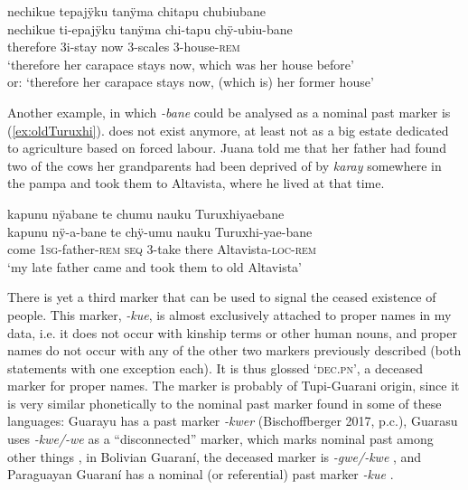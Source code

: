 \ea\label{ex:former-house}
\begingl 
\glpreamble nechikue tepajÿku tanÿma chitapu chubiubane\\
\gla nechikue ti-epajÿku tanÿma chi-tapu chÿ-ubiu-bane\\ 
\glb therefore 3i-stay now 3-scales 3-house-\textsc{rem}\\ 
\glft ‘therefore her carapace stays now, which was her house before’\\or: ‘therefore her carapace stays now, (which is) her former house’
\trailingcitation{[rxx-n121128s.24]}
\xe

Another example, in which \textit{-bane} could be analysed as a nominal past marker is (\ref{ex:oldTuruxhi}).  does not exist anymore, at least not as a big estate dedicated to agriculture based on forced labour. Juana told me that her father had found two of the cows her grandparents had been deprived of by \textit{karay} somewhere in the pampa and took them to Altavista, where he lived at that time.

\ea\label{ex:oldTuruxhi}
\begingl
\glpreamble kapunu nÿabane te chumu nauku Turuxhiyaebane\\
\gla kapunu nÿ-a-bane te chÿ-umu nauku Turuxhi-yae-bane\\
\glb come 1\textsc{sg}-father-\textsc{rem} \textsc{seq} 3-take there Altavista-\textsc{loc}-\textsc{rem}\\
\glft ‘my late father came and took them to old Altavista’
\endgl
\trailingcitation{[jxx-e150925l-1.238]}
\xe
{}

There is yet a third marker that can be used to signal the ceased existence of people. This marker, \textit{-kue}, is almost exclusively attached to proper names in my data, i.e. it does not occur with kinship terms or other human nouns, and proper names do not occur with any of the other two markers previously described (both statements with one exception each). It is thus glossed ‘\textsc{dec.pn}’, a deceased marker for proper names. The marker is probably of Tupi-Guarani origin, since it is very similar phonetically to the nominal past marker found in some of these languages: Guarayu has a past marker \textit{-kwer} (Bischoffberger 2017, p.c.), Guarasu uses \textit{-kwe/-we} as a “disconnected” marker, which marks nominal past among other things \citep[237--238]{RamirezAL2017}, in Bolivian Guaraní, the deceased marker is \textit{-gwe/-kwe} \citep[339]{Gustafson2014}, and Paraguayan Guaraní has a nominal (or referential) past marker \textit{-kue} \citep[34]{Nordhoff2004}. 

